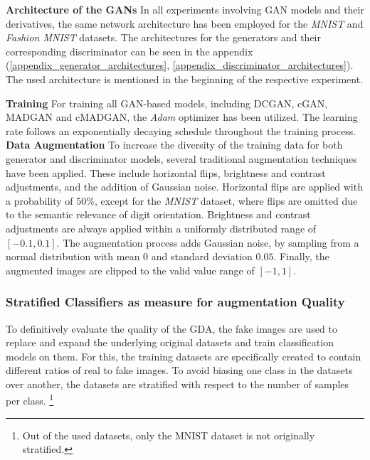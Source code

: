 \noindent\textbf{Architecture of the GANs}
In all experiments involving GAN models and their derivatives, the same network architecture has been employed for the \textit{MNIST} and \textit{Fashion MNIST} datasets. The architectures for the generators and their corresponding discriminator can be seen in the appendix (\ref{appendix_generator_architectures}, \ref{appendix_discriminator_architectures}). The used architecture is mentioned in the beginning of the respective experiment.

\noindent\textbf{Training}
For training all GAN-based models, including DCGAN, cGAN, MADGAN and cMADGAN, the \textit{Adam} optimizer has been utilized. The learning rate follows an exponentially decaying schedule throughout the training process.\\

\noindent\textbf{Data Augmentation}\label{body_experiment_dataaugmentation}
To increase the diversity of the training data for both generator and discriminator models, several traditional augmentation techniques have been applied. These include horizontal flips, brightness and contrast adjustments, and the addition of Gaussian noise.
Horizontal flips are applied with a probability of \(50\%\), except for the \textit{MNIST} dataset, where flips are omitted due to the semantic relevance of digit orientation. Brightness and contrast adjustments are always applied within a uniformly distributed range of \([-0.1, 0.1]\). The augmentation process adds Gaussian noise, by sampling from a normal distribution with mean \(0\) and standard deviation \(0.05\). Finally, the augmented images are clipped to the valid value range of \([-1, 1]\).

\subsubsection{Stratified Classifiers as measure for augmentation Quality}
To definitively evaluate the quality of the GDA, the fake images are used to replace and expand the underlying original datasets and train classification models on them. For this, the training datasets are specifically created to contain different ratios of real to fake images. To avoid biasing one class in the datasets over another, the datasets are stratified with respect to the number of samples per class. \footnote{Out of the used datasets, only the MNIST dataset is not originally stratified.}

